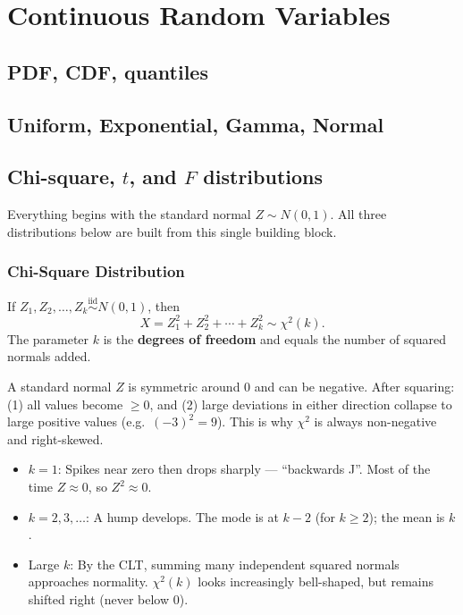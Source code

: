 
\section{Continuous Random Variables}

\subsection{PDF, CDF, quantiles}


\subsection{Uniform, Exponential, Gamma, Normal}


\subsection{Chi-square, $t$, and $F$ distributions}

Everything begins with the standard normal $Z \sim N(0,1)$.
All three distributions below are built from this single building block.

\subsubsection*{Chi-Square Distribution}

\begin{definition}
If $Z_1, Z_2, \ldots, Z_k \stackrel{\text{iid}}{\sim} N(0,1)$, then
\[
X = Z_1^2 + Z_2^2 + \cdots + Z_k^2 \sim \chi^2(k).
\]
The parameter $k$ is the \textbf{degrees of freedom} and equals the number of squared normals added.
\end{definition}

\begin{remark}
A standard normal $Z$ is symmetric around 0 and can be negative. After squaring: (1) all values become $\geq 0$, and (2) large deviations in either direction collapse to large positive values (e.g.\ $(-3)^2 = 9$). This is why $\chi^2$ is always non-negative and right-skewed.
\end{remark}

\begin{remark}
\begin{itemize}
    \item $k=1$: Spikes near zero then drops sharply — ``backwards J''. Most of the time $Z \approx 0$, so $Z^2 \approx 0$.
    \item $k=2,3,\ldots$: A hump develops. The mode is at $k-2$ (for $k \geq 2$); the mean is $k$.
    \item Large $k$: By the CLT, summing many independent squared normals approaches normality. $\chi^2(k)$ looks increasingly bell-shaped, but remains shifted right (never below 0).
\end{itemize}
\end{remark}

